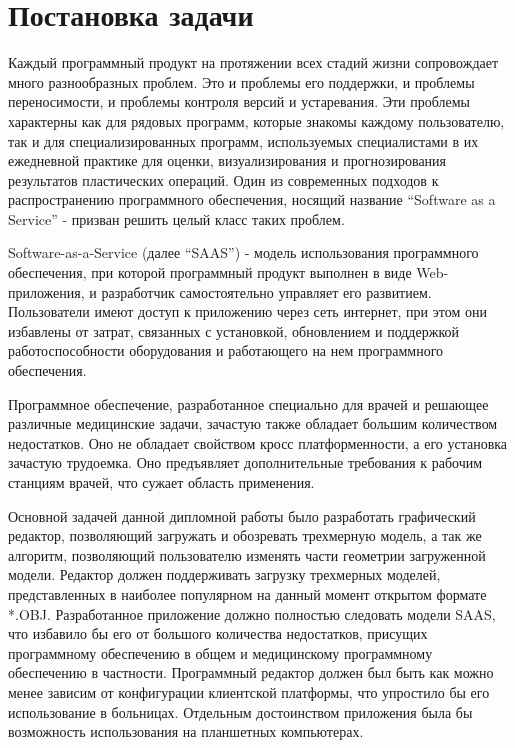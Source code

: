 \section{Постановка задачи}
Каждый программный продукт на протяжении всех стадий жизни сопровождает много
разнообразных проблем. Это и проблемы его поддержки, и проблемы переносимости, и
проблемы контроля версий и устаревания. Эти проблемы характерны как для рядовых
программ, которые знакомы каждому пользователю, так и для специализированных
программ, используемых специалистами в их ежедневной практике для оценки,
визуализирования и прогнозирования результатов пластических операций. Один из
современных подходов к распространению программного обеспечения, носящий
название ``Software as a Service'' - призван решить целый класс таких проблем.

Software-as-a-Service (далее ``SAAS'') - модель использования программного
обеспечения, при которой программный продукт выполнен в виде Web-приложения, и
разработчик самостоятельно управляет его развитием. Пользователи имеют доступ к
приложению через сеть интернет, при этом они избавлены от затрат, связанных с
установкой, обновлением и поддержкой работоспособности оборудования и
работающего на нем программного обеспечения.

Программное обеспечение, разработанное специально для врачей и решающее
различные медицинские задачи, зачастую также обладает большим количеством
недостатков. Оно не обладает свойством кросс платформенности, а его установка
зачастую трудоемка. Оно предъявляет дополнительные требования к рабочим
станциям врачей, что сужает область применения.

Основной задачей данной дипломной работы было разработать графический редактор,
позволяющий загружать и обозревать трехмерную модель, а так же алгоритм,
позволяющий пользователю изменять части геометрии загруженной модели.  Редактор
должен поддерживать загрузку трехмерных моделей, представленных в наиболее
популярном на данный момент открытом формате *.OBJ.  Разработанное приложение
должно полностью следовать модели SAAS, что избавило бы его от большого
количества недостатков, присущих программному обеспечению в общем и медицинскому
программному обеспечению в частности. Программный редактор должен был быть как
можно менее зависим от конфигурации клиентской платформы, что упростило бы его
использование в больницах. Отдельным достоинством приложения была бы возможность
использования на планшетных компьютерах.

